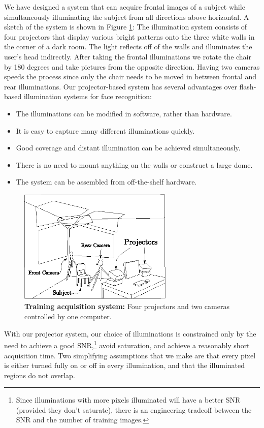 \documentclass[10pt,journal,letterpaper,compsoc]{IEEEtran}
\begin{document}
We have designed a system that can acquire frontal images of a subject while
simultaneously illuminating the subject from all directions above horizontal. A sketch of the
system is shown in Figure \ref{fig:system}: The illumination
system consists of four projectors that display various bright
patterns onto the three white walls in the corner of a dark
room.  The light reflects off of the walls and illuminates the
user's head indirectly.  After taking the frontal illuminations
we rotate the chair by 180 degrees and take pictures from the
opposite direction.  Having two cameras speeds the process
since only the chair needs to be moved in between frontal and
rear illuminations. Our projector-based system has several
advantages over flash-based illumination systems for face recognition:
\begin{itemize}
\item The illuminations can be modified in software, rather than hardware.
\item It is easy to capture many different illuminations quickly.
\item Good coverage and distant illumination can be achieved simultaneously.
\item There is no need to mount anything on the walls or construct a large dome.
\item The system can be assembled from off-the-shelf hardware.
\end{itemize}
\begin{figure}
\centering
\includegraphics[width=2.9in]{Figure_6}
\caption{{\bf Training acquisition system:} Four projectors and two cameras controlled by one computer.}
\vspace{-2em}
\label{fig:system}
\end{figure}
With our projector system, our choice of illuminations is
constrained only by the need to achieve a good
SNR,\footnote{Since illuminations with more pixels illuminated
will have a better SNR (provided they don't saturate), there is
an engineering tradeoff between the SNR and the number of
training images.} avoid saturation, and achieve a reasonably
short acquisition time.  Two simplifying assumptions that we
make are that every pixel is either turned fully on or off in
every illumination, and that the illuminated regions do not
overlap.
\end{document}
